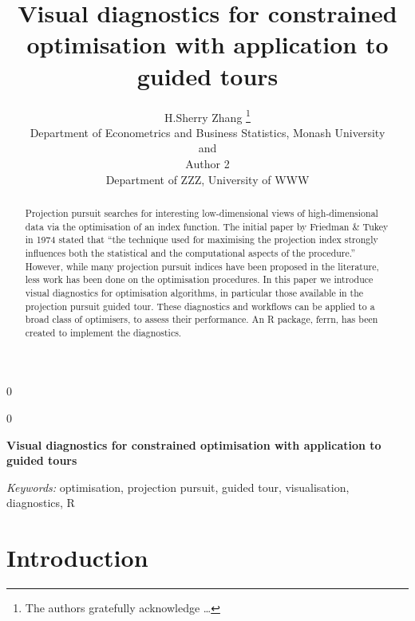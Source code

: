 \documentclass[12pt]{article}
\newcommand{\blind}{0}
\begin{document}
\def\spacingset#1{\renewcommand{\baselinestretch}%
{#1}\small\normalsize} \spacingset{1}



\blind
{
  \title{\bf Visual diagnostics for constrained optimisation with application to guided tours}

  \author{
        H.Sherry Zhang \thanks{The authors gratefully acknowledge \ldots{}} \\
    Department of Econometrics and Business Statistics, Monash University\\
     and \\     Author 2 \\
    Department of ZZZ, University of WWW\\
      }
  \maketitle
} \fi

\blind
{
  \bigskip
  \bigskip
  \bigskip
  \begin{center}
    {\LARGE\bf Visual diagnostics for constrained optimisation with application to guided tours}
  \end{center}
  \medskip
} \fi

\bigskip
\begin{abstract}
Projection pursuit searches for interesting low-dimensional views of high-dimensional data via the optimisation of an index function. The initial paper by Friedman \& Tukey in 1974 stated that ``the technique used for maximising the projection index strongly influences both the statistical and the computational aspects of the procedure.'' However, while many projection pursuit indices have been proposed in the literature, less work has been done on the optimisation procedures. In this paper we introduce visual diagnostics for optimisation algorithms, in particular those available in the projection pursuit guided tour. These diagnostics and workflows can be applied to a broad class of optimisers, to assess their performance. An R package, ferrn, has been created to implement the diagnostics.
\end{abstract}

\noindent%
{\it Keywords:} optimisation, projection pursuit, guided tour, visualisation, diagnostics, R
\vfill

\newpage
\spacingset{1.45} %

\hypertarget{introduction}{%
\section{Introduction}\label{introduction}}
\end{document}
